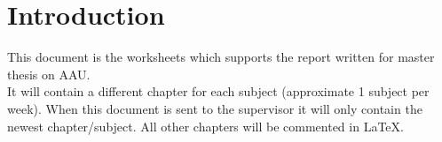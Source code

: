 \chapter{Introduction}
This document is the worksheets which supports the report written for master thesis on AAU.\\

It will contain a different chapter for each subject (approximate 1 subject per week). When this document is sent to the supervisor it will only contain the newest chapter/subject. All other chapters will be commented in \LaTeX. \\